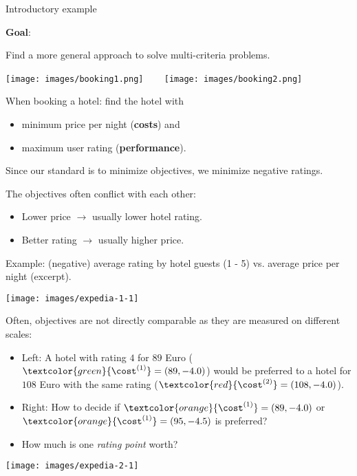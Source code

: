 \begin{frame}[allowframebreaks]{Introductory example}
\vspace*{0.5cm}

\textbf{Goal}:

Find a more general approach to solve multi-criteria problems.


\begin{center}
\texttt{[image: images/booking1.png]} ~~~ \texttt{[image: images/booking2.png]}
\end{center}

When booking a hotel: find the hotel with

\begin{itemize}
\item minimum price per night (\textbf{costs}) and
\item maximum user rating (\textbf{performance}).
\end{itemize}

\vfill

\begin{footnotesize}
Since our standard is to minimize objectives, we minimize negative ratings.
\end{footnotesize}

\framebreak

The objectives often conflict with each other:

\begin{itemize}
\item Lower price $\to$ usually lower hotel rating.
\item Better rating $\to$ usually higher price.
\end{itemize}

Example: (negative) average rating by hotel guests (1 - 5) vs. average price per night (excerpt).

\vspace*{0.2cm}

\begin{center}
\texttt{[image: images/expedia-1-1]}
\end{center}

\framebreak

Often, objectives are not directly comparable as they are measured on different scales:

\begin{itemize}
    \item Left: A hotel with rating $4$ for $89$ Euro ($\textcolor{green}{\cost^{(1)}} = \left(89, - 4.0\right)$) would be preferred to a hotel for $108$ Euro with the same rating ($\textcolor{red}{\cost^{(2)}} = \left(108, - 4.0\right)$).
\item Right: How to decide if $\textcolor{orange}{\cost^{(1)}} = \left(89, - 4.0\right)$ or $\textcolor{orange}{\cost^{(1)}} = \left(95, - 4.5\right)$ is preferred?
\item How much is one \textit{rating point} worth?
\end{itemize}

\centering \texttt{[image: images/expedia-2-1]}

\end{frame}


